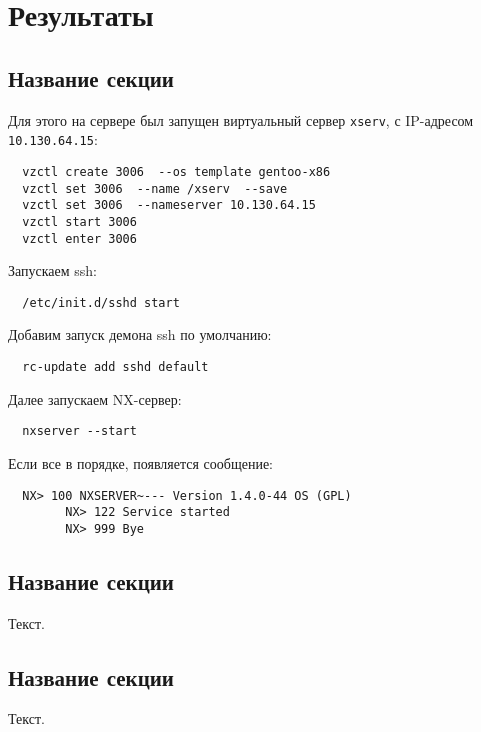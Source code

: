 
\chapter{Результаты}
\label{chap3}

\section{Название секции}
\label{chap3:sec1}

% 
Для этого на сервере был запущен виртуальный сервер 
\verb|xserv|, с IP-адресом \verb|10.130.64.15|:

\begin{verbatim}
  vzctl create 3006  --os template gentoo-x86
  vzctl set 3006  --name /xserv  --save
  vzctl set 3006  --nameserver 10.130.64.15
  vzctl start 3006
  vzctl enter 3006
\end{verbatim}
Запускаем ssh:
\begin{verbatim}
  /etc/init.d/sshd start 
\end{verbatim}
Добавим запуск демона ssh по умолчанию:
\begin{verbatim}
  rc-update add sshd default
\end{verbatim}

Далее запускаем NX-сервер:
\begin{verbatim}
  nxserver --start
\end{verbatim}
Если все в порядке, появляется сообщение:
\begin{verbatim}
  NX> 100 NXSERVER~--- Version 1.4.0-44 OS (GPL)
        NX> 122 Service started
        NX> 999 Bye
\end{verbatim}


\section{Название секции}
\label{chap3:sec2}

Текст.

\section{Название секции}
\label{chap3:sec3}

Текст.

